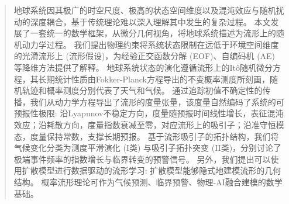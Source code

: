 \begin{abstract}

地球系统因其极广的时空尺度、极高的状态空间维度以及混沌效应与随机扰动的深度耦合，基于传统理论难以深入理解其中发生的复杂过程。
本文发展了一套统一的数学框架，从微分几何视角，将地球系统描述为流形上的随机动力学过程。
我们提出物理约束将系统状态限制在远低于环境空间维度的光滑流形上 (流形假设)，为经验正交函数分解 (EOF)、自编码机 (AE) 等降维方法提供了解释。
地球系统状态的演化遵循流形上的Itô随机微分方程，其长期统计性质由Fokker-Planck方程导出的不变概率测度所刻画，随机轨迹和概率测度分别代表了天气和气候。
通过追踪初值不确定性的传播，我们从动力学方程导出了流形的度量张量，该度量自然编码了系统的可预报性极限: 沿Lyapunov不稳定方向，度量随预报时间线性增长，表征混沌效应；沿耗散方向，度量指数衰减至零，对应流形上的吸引子；沿准守恒模态，度量保持常数，支撑长期预报。
基于流形吸引子的拓扑结构，我们将气候变化分类为测度平滑演化 (I类) 与吸引子拓扑突变 (II类)，分别讨论了极端事件频率的指数增长与临界转变的预警信号。
另外，我们提出可以使用扩散模型进行数据驱动的流形学习: 扩散模型能够隐式地建模流形的几何结构。
概率流形理论可作为气候预测、临界预警、物理-AI融合建模的数学基础。

\end{abstract}
